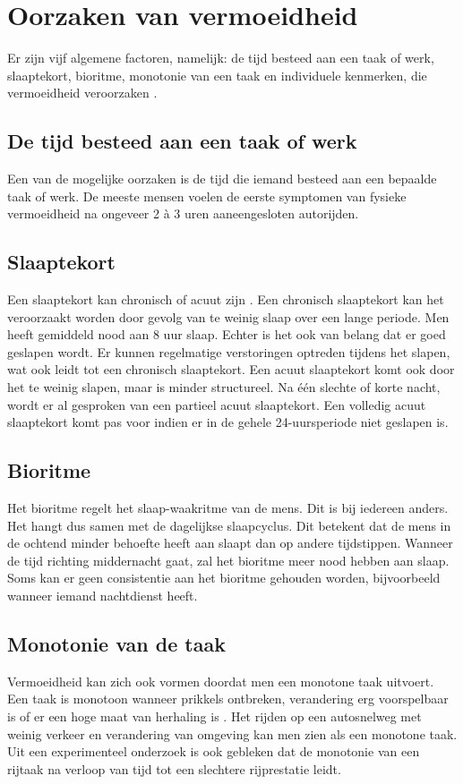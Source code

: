 \section{Oorzaken van vermoeidheid}
Er zijn vijf algemene factoren, namelijk: de tijd besteed aan een taak of werk, slaaptekort, bioritme, monotonie van een taak en individuele kenmerken, die vermoeidheid veroorzaken \autocite{Brown}.
\subsection{De tijd besteed aan een taak of werk}
Een van de mogelijke oorzaken is de tijd die iemand besteed aan een bepaalde taak of werk. De meeste mensen voelen de eerste symptomen van fysieke vermoeidheid na ongeveer 2 à 3 uren aaneengesloten autorijden.
\subsection{Slaaptekort}
Een slaaptekort kan chronisch of acuut zijn \autocite{VanSchagen2003}. Een chronisch slaaptekort kan het veroorzaakt worden door gevolg van te weinig slaap over een lange periode. Men heeft gemiddeld nood aan 8 uur slaap. Echter is het ook van belang dat er goed geslapen wordt. Er kunnen regelmatige verstoringen optreden tijdens het slapen, wat ook leidt tot een chronisch slaaptekort. Een acuut slaaptekort komt ook door het te weinig slapen, maar is minder structureel. Na één slechte of korte nacht, wordt er al gesproken van een partieel acuut slaaptekort. Een volledig acuut slaaptekort komt pas voor indien er in de gehele 24-uursperiode niet geslapen is.
\subsection{Bioritme}
Het bioritme regelt het slaap-waakritme van de mens. Dit is bij iedereen anders. Het hangt dus samen met de dagelijkse slaapcyclus. Dit betekent dat de mens in de ochtend minder behoefte heeft aan slaapt dan op andere tijdstippen. Wanneer de tijd richting middernacht gaat, zal het bioritme meer nood hebben aan slaap. Soms kan er geen consistentie aan het bioritme gehouden worden, bijvoorbeeld wanneer iemand nachtdienst heeft.
\subsection{Monotonie van de taak}
Vermoeidheid kan zich ook vormen doordat men een monotone taak uitvoert. Een taak is monotoon wanneer prikkels ontbreken, verandering erg voorspelbaar is of er een hoge maat van herhaling is \autocite{DaCoTA}. Het rijden op een autosnelweg met weinig verkeer en verandering van omgeving kan men zien als een monotone taak. Uit een experimenteel onderzoek is ook gebleken dat de monotonie van een rijtaak na verloop van tijd tot een slechtere rijprestatie leidt.
